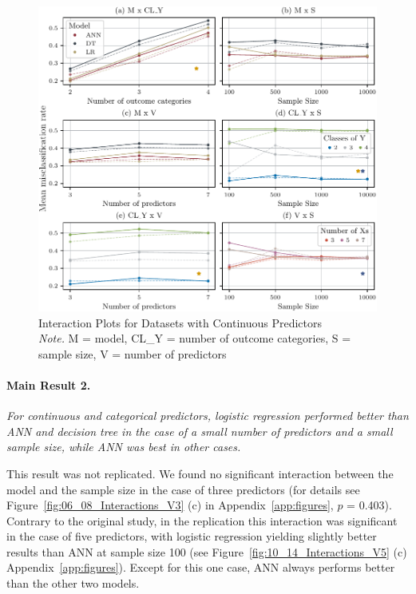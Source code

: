 \documentclass[12pt]{article}
\begin{document}
    \begin{figure}[h]
        \centering
        \includegraphics{fig/02_04_Interactions_cont.pdf}
        \caption{Interaction Plots for Datasets with Continuous Predictors \\
        \textit{Note.} M = model, CL\_Y = number of outcome categories, S = sample size, V = number of predictors}
        \label{fig:02_04_Interactions_cont}
    \end{figure}
    
    \paragraph{Main Result 2.}
    \textit{For continuous and categorical predictors, logistic regression performed better than ANN and decision tree in the case of a small number of predictors and a small sample size, while ANN was best in other cases.}

    This result was not replicated. We found no significant interaction between the model and the sample size in the case of three predictors (for details see Figure~\ref{fig:06_08_Interactions_V3} (c) in Appendix~\ref{app:figures}, $p$ = 0.403). Contrary to the original study, in the replication this interaction was significant in the case of five predictors, with logistic regression yielding slightly better results than ANN at sample size 100 (see Figure~\ref{fig:10_14_Interactions_V5} (c) Appendix~\ref{app:figures}). Except for this one case, ANN always performs better than the other two models.
\end{document}

